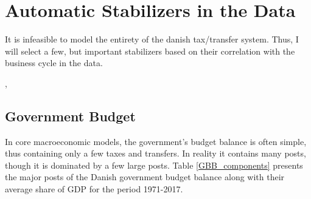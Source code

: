 




\section{Automatic Stabilizers in the Data}
\label{chap:Emprirics}
It is infeasible to model the entirety of the danish tax/transfer system. Thus, I will select a few, but important stabilizers based on their correlation with the business cycle in the data.

\citet{cohen1999automatic}, 


\subsection{Government Budget}
In core macroeconomic models, the government's budget balance is often simple, thus containing only a few taxes and transfers. In reality it contains many posts, though it is dominated by a few large posts. Table \ref{GBB_components} presents the major posts of the Danish government budget balance along with their average share of GDP for the period 1971-2017.  


